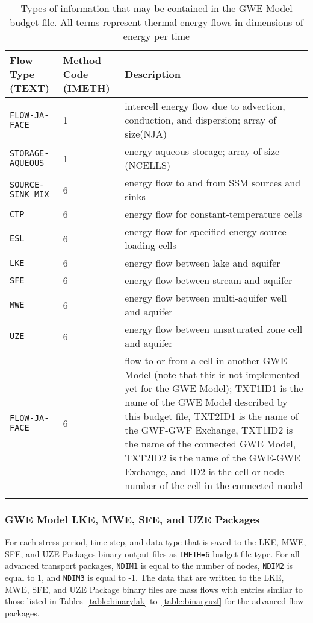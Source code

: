 \begin{longtable}{p{3.5cm} p{2cm} p{9cm}}
\caption{Types of information that may be contained in the GWE Model budget file.  All terms represent thermal energy flows in dimensions of energy per time} 
\tabularnewline
\hline
\textbf{Flow Type (TEXT)} & \textbf{Method Code (IMETH)} & \textbf{Description} \\
\hline
\endhead
\hline
\endfoot
\texttt{FLOW-JA-FACE} & 1 & intercell energy flow due to advection, conduction, and dispersion; array of size(NJA) \\
\texttt{STORAGE-AQUEOUS} & 1 & energy aqueous storage; array of size (NCELLS) \\
\texttt{SOURCE-SINK MIX} & 6 & energy flow to and from SSM sources and sinks \\
\texttt{CTP} & 6 & energy flow for constant-temperature cells \\
\texttt{ESL} & 6 & energy flow for specified energy source loading cells \\
\texttt{LKE} & 6 & energy flow between lake and aquifer \\
\texttt{SFE} & 6 & energy flow between stream and aquifer \\
\texttt{MWE} & 6 & energy flow between multi-aquifer well and aquifer \\
\texttt{UZE} & 6 & energy flow between unsaturated zone cell and aquifer \\
\texttt{FLOW-JA-FACE} & 6 & flow to or from a cell in another GWE Model (note that this is not implemented yet for the GWE Model); TXT1ID1 is the name of the GWE Model described by this budget file, TXT2ID1 is the name of the GWF-GWF Exchange, TXT1ID2 is the name of the connected GWE Model, TXT2ID2 is the name of the GWE-GWE Exchange, and ID2 is the cell or node number of the cell in the connected model \\
\label{table:gwebud}
\end{longtable}

\subsubsection{GWE Model LKE, MWE, SFE, and UZE Packages}

\vspace{5mm}
For each stress period, time step, and data type that is saved to the LKE, MWE, SFE, and UZE Packages binary output files as \texttt{IMETH=6} budget file type. For all advanced transport packages, \texttt{NDIM1} is equal to the number of nodes, \texttt{NDIM2} is equal to 1, and \texttt{NDIM3} is equal to -1. The data that are written to the LKE, MWE, SFE, and UZE Package binary files are mass flows with entries similar to those listed in Tables~\ref{table:binarylak} to~\ref{table:binaryuzf} for the advanced flow packages.


